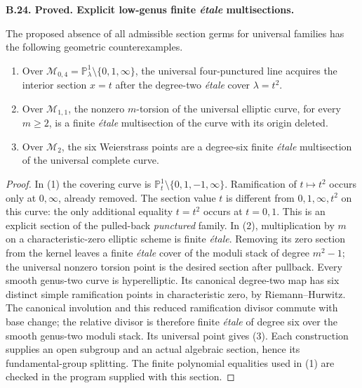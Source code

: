 \documentclass[11pt,oneside]{article}
\makeatletter
\newcounter{statementanchor}
\newenvironment{statement}[3]{%
 \refstepcounter{statementanchor}\def\@currentlabel{#1}%
 \par\addvspace{9pt}\noindent
 \textbf{#1. #2. #3.}\par\nobreak\noindent\ignorespaces
}{\par\addvspace{5pt}}
\makeatother
\begin{document}
\begin{statement}{B.24}{Proved}{Explicit low-genus finite \emph{\'etale} multisections}
\label{st:B.24}

The proposed absence of all admissible section germs for universal
families has the following geometric counterexamples.
\begin{enumerate}
\item Over $\mathcal M_{0,4}=\mathbb P^1_\lambda\setminus\{0,1,\infty\}$,
the universal four-punctured line acquires the interior section
$x=t$ after the degree-two \emph{\'etale} cover $\lambda=t^2$.
\item Over $\mathcal M_{1,1}$, the nonzero $m$-torsion of the universal
elliptic curve, for every $m\geq2$, is a finite \emph{\'etale}
multisection of the curve with its origin deleted.
\item Over $\mathcal M_2$, the six Weierstrass points are a degree-six
finite \emph{\'etale} multisection of the universal complete curve.
\end{enumerate}
\end{statement}
\begin{proof}
In (1) the covering curve is
$\mathbb P^1_t\setminus\{0,1,-1,\infty\}$.
Ramification of $t\mapsto t^2$ occurs only at $0,\infty$, already
removed.  The section value $t$ is different from $0,1,\infty,t^2$
on this curve: the only additional equality $t=t^2$ occurs at
$t=0,1$.  This is an explicit section of the pulled-back
\emph{punctured} family.
In (2), multiplication by $m$ on a characteristic-zero elliptic
scheme is finite \emph{\'etale}.  Removing its zero section from the
kernel leaves a finite \emph{\'etale} cover of the moduli stack of
degree $m^2-1$; the universal nonzero torsion point is the desired
section after pullback.
Every smooth genus-two curve is hyperelliptic.  Its canonical
degree-two map has six distinct simple ramification points in
characteristic zero, by Riemann--Hurwitz.  The canonical involution
and this reduced ramification divisor commute with base change;
the relative divisor is therefore finite \emph{\'etale} of degree
six over the smooth genus-two moduli stack.  Its universal point
gives (3).  Each construction supplies an open subgroup and an
actual algebraic section, hence its fundamental-group splitting.
The finite polynomial equalities used in (1) are checked in the
program supplied with this section.
\end{proof}
\end{document}
